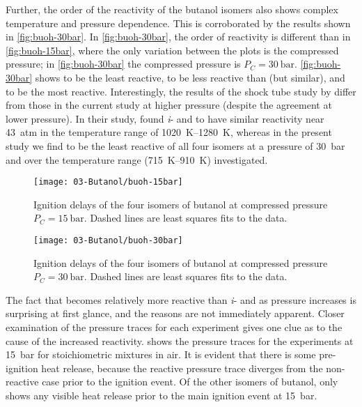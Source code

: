 \documentclass[12pt, letterpaper]{article}
\begin{document}
Further, the order of the reactivity of the butanol isomers also shows complex
temperature and pressure dependence. This is corroborated by the results shown
in \autoref{fig:buoh-30bar}. In \autoref{fig:buoh-30bar}, the order of
reactivity is different than in \autoref{fig:buoh-15bar}, where the only
variation between the plots is the compressed pressure; in
\autoref{fig:buoh-30bar} the compressed pressure is $P_C=\SI{30}{\bar}$.
\autoref{fig:buoh-30bar} shows \iBuOH{} to be the least reactive,
\sBuOH{} to be less reactive than \tBuOH{} (but similar),
and \nBuOH{} to be the most reactive. Interestingly, the results of
the shock tube study by \textcite{Stranic2012} differ from those in the current
study at higher pressure (despite the agreement at lower pressure). In their
study, \textcite{Stranic2012} found \textit{i}- and \nBuOH{} to have
similar reactivity near \SI{43}{atm} in the temperature range of \SIrange{1020}{1280}{\kelvin},
whereas in the present study we find \iBuOH{} to be the least
reactive of all four isomers at a pressure of \SI{30}{\bar} and over the temperature
range (\SIrange{715}{910}{\kelvin}) investigated.

\begin{figure}
    \begin{floatrow}
    \ffigbox
        {\texttt{[image: 03-Butanol/buoh-15bar]}}
        {\caption{Ignition delays of the four isomers of butanol at compressed
            pressure $P_C=\SI{15}{\bar}$. Dashed lines are least squares fits to the
            data.}
        \label{fig:buoh-15bar}}
    \ffigbox
        {\texttt{[image: 03-Butanol/buoh-30bar]}}
        {\caption{Ignition delays of the four isomers of butanol at compressed
            pressure $P_C=\SI{30}{\bar}$. Dashed lines are least squares fits to the
            data.}
        \label{fig:buoh-30bar}}
    \end{floatrow}
\end{figure}

The fact that \tBuOH{} becomes relatively more reactive than
\textit{i}- and \sBuOH{} as pressure increases is surprising at first
glance, and the reasons are not immediately apparent. Closer examination of the
pressure traces for each experiment gives one clue as to the cause of the
increased reactivity.  shows the pressure traces for
the \tBuOH{} experiments at \SI{15}{\bar} for stoichiometric mixtures in
air. It is evident that there is some pre-ignition heat release, because the
reactive pressure trace diverges from the non-reactive case prior to the
ignition event. Of the other isomers of butanol, only \nBuOH{} shows
any visible heat release prior to the main ignition event at \SI{15}{\bar}.
\end{document}
